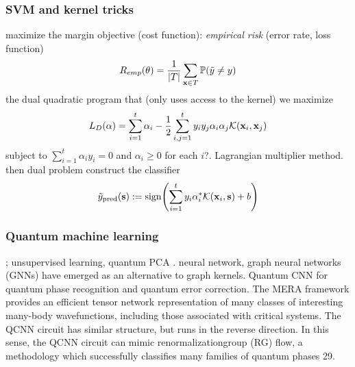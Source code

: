 \subsubsection{SVM and kernel tricks}
maximize the margin
objective (cost function): \emph{empirical risk} (error rate, loss function)
\begin{equation}
	R_{emp}(\vb{\theta}) = \frac{1}{\abs{T}}
	\sum_{\vb{x}\in T} \mathbb{P} (\tilde{y} \neq y)
\end{equation}
the dual quadratic program that (only uses access to the kernel)
we maximize 
\begin{equation}
	L_D(\alpha) = \sum_{i=1}^t \alpha_i - \frac{1}{2}\sum_{i,j=1}^t y_i y_j \alpha_i \alpha_j \mathcal{K}(\vb{x}_i,\vb{x}_j)
\end{equation}
subject to $\sum_{i=1}^t \alpha_i y_i = 0$ and $\alpha_i\ge 0$ for each $i$?.
Lagrangian multiplier method. then dual problem
construct the classifier
\begin{equation}
	\tilde{y}_{\textup{pred}}(\vb{s}) := \textup{sign} \qty(
		\sum_{i=1}^t y_i \alpha_i^* \mathcal{K}(\vb{x}_i,\vb{s}) + b
	)
\end{equation}


\subsubsection{Quantum machine learning}\label{sec:quantum_machine_learning}
\cite{biamonteQuantumMachineLearning2017}; 
unsupervised learning, quantum PCA \cite{lloydQuantumPrincipalComponent2014} \cite{tangQuantumPrincipalComponent2021}.
neural network,
graph neural networks (GNNs) have emerged as an alternative to graph kernels.
Quantum CNN \cite{congQuantumConvolutionalNeural2019} for quantum phase recognition and quantum error correction.
The MERA framework provides an efficient tensor network representation of many classes of interesting many-body wavefunctions, including those associated with critical systems.
The QCNN circuit has similar structure, but runs in the reverse direction.
In this sense, the QCNN circuit can mimic renormalizationgroup (RG) ﬂow, a methodology which successfully classifies many families of quantum phases 29.

